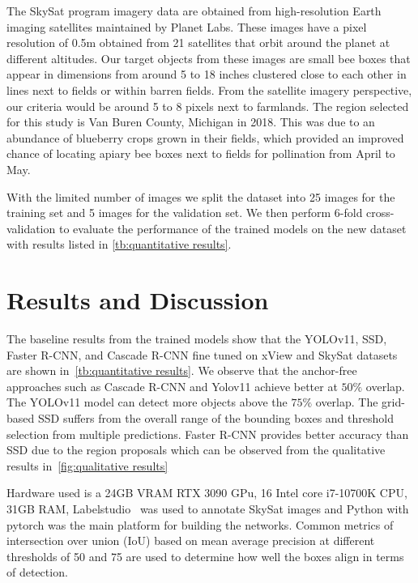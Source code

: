 \documentclass{article}
\begin{document}
The SkySat program imagery data are obtained from high-resolution Earth imaging satellites maintained by Planet Labs. These images have a pixel resolution of 0.5m obtained from 21 satellites that orbit around the planet at different altitudes. Our target objects from these images are small bee boxes that appear in dimensions from around 5 to 18 inches clustered close to each other in lines next to fields or within barren fields. From the satellite imagery perspective, our criteria would be around 5 to 8 pixels next to farmlands. The region selected for this study is Van Buren County, Michigan in 2018. This was due to an abundance of blueberry crops grown in their fields, which provided an improved chance of locating apiary bee boxes next to fields for pollination from April to May.

With the limited number of images we split the dataset into 25 images for the training set and 5 images for the validation set. We then perform 6-fold cross-validation to evaluate the performance of the trained models on the new dataset with results listed in \cref{tb:quantitative results}.



\section{Results and Discussion} 
\label{sec:Results}
%


The baseline results from the trained models show that the YOLOv11, SSD, Faster R-CNN, and Cascade R-CNN fine tuned on xView and SkySat datasets are shown in~\cref{tb:quantitative results}. We observe that the anchor-free approaches such as Cascade R-CNN and Yolov11 achieve better at $50\%$ overlap. The YOLOv11 model can detect more objects above the $75\%$ overlap. The grid-based SSD suffers from the overall range of the bounding boxes and threshold selection from multiple predictions. Faster R-CNN provides better accuracy than SSD due to the region proposals which can be observed from the qualitative results in~\cref{fig:qualitative results}


Hardware used is a 24GB VRAM RTX 3090 GPu, 16 Intel core i7-10700K CPU, 31GB RAM, Labelstudio~\cite{2025Tkachenko} was used to annotate SkySat images and Python with pytorch was the main platform for building the networks. Common metrics of intersection over union (IoU) based on mean average precision at different thresholds of 50 and 75 are used to determine how well the boxes align in terms of detection.
\end{document}

